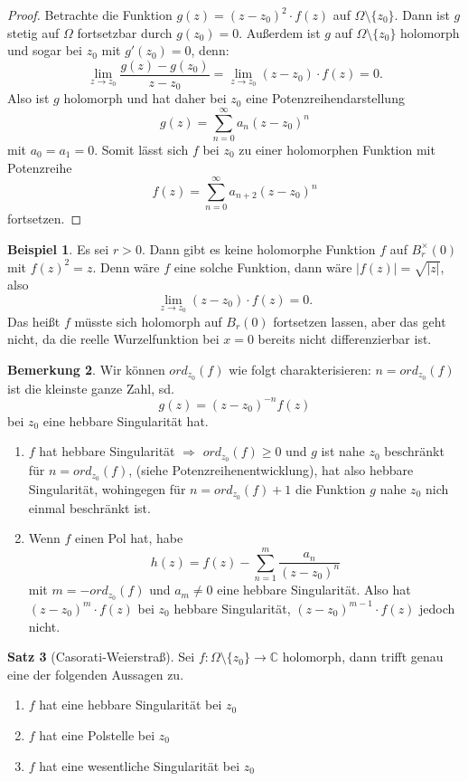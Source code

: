 \documentclass[11pt,titlepage]{article}
\theoremstyle{definition}
\newtheorem{theorem}{Satz}[section]
\newtheorem{example}[theorem]{Beispiel}
\newtheorem{remark}[theorem]{Bemerkung}
\theoremstyle{remark}
\begin{document}
	\begin{proof}
		Betrachte die Funktion $g(z)=(z-z_0)^2 \cdot f(z)$ auf $\Omega\setminus\{z_0\}$. Dann ist 
		$g$ stetig auf $\Omega$ fortsetzbar durch $g(z_0)=0$. Außerdem ist $g$ auf 
		$\Omega\setminus\{z_0\}$ holomorph und sogar bei $z_0$ mit $g'(z_0)=0$, denn:
		\[ \lim_{z\to z_0} \frac{g(z)-g(z_0)}{z-z_0} = \lim_{z\to z_0} (z-z_0)\cdot f(z) =0. \]
		Also ist $g$ holomorph und hat daher bei $z_0$ eine Potenzreihendarstellung 
		\[g(z)=\sum_{n=0}^{\infty} a_n (z-z_0)^n \] mit $a_0=a_1=0$. Somit lässt sich $f$ bei $z_0$ 
		zu einer holomorphen Funktion mit Potenzreihe
		\[f(z)=\sum_{n=0}^{\infty} a_{n+2}(z-z_0)^n \]
		fortsetzen.
	\end{proof}
	
	\begin{example}
		Es sei $r>0$. Dann gibt es keine holomorphe Funktion $f$ auf $B_r^{\times}(0)$ mit $f(z)^2 =z$. 
		Denn wäre $f$ eine solche Funktion, dann wäre $|f(z)|=\sqrt{|z|}$, also 
		\[\lim_{z\to z_0} (z-z_0)\cdot f(z) =0. \]
		Das heißt $f$ müsste sich holomorph auf $B_r(0)$ fortsetzen lassen, aber das geht nicht, da die 
		reelle Wurzelfunktion bei $x=0$ bereits nicht differenzierbar ist.
	\end{example}
	
	\begin{remark}
		Wir können $ord_{z_0}(f)$ wie folgt charakterisieren: $n=ord_{z_0}(f)$ ist die kleinste ganze 
		Zahl, sd.
		\[ g(z)= (z-z_0)^{-n} f(z) \]
		bei $z_0$ eine hebbare Singularität hat. 
		\begin{enumerate}
			\item $f$ hat hebbare Singularität $\Rightarrow$ $ord_{z_0}(f)\geq 0$ und $g$ ist nahe 
			$z_0$ beschränkt für $n=ord_{z_0}(f)$, (siehe Potenzreihenentwicklung), hat also 
			hebbare Singularität, wohingegen für $n=ord_{z_0}(f)+1$ die Funktion $g$ nahe 
			$z_0$ nich einmal beschränkt ist.
			\item Wenn $f$ einen Pol hat, habe
			\[ h(z)=f(z)-\sum_{n=1}^m \frac{a_n}{(z-z_0)^n} \]
			mit $m=-ord_{z_0}(f)$ und $a_m \neq 0$ eine hebbare Singularität. Also hat 
			$(z-z_0)^m \cdot f(z)$ bei $z_0$ hebbare Singularität, $(z-z_0)^{m-1}\cdot f(z)$ jedoch 
			nicht.
		\end{enumerate}
	\end{remark}
	
	\begin{theorem}[Casorati-Weierstraß]
		Sei $f:\Omega\setminus\{z_0\}\to\mathbb{C}$ holomorph, dann trifft genau eine der folgenden 
		Aussagen zu.
		\begin{enumerate}
			\item $f$ hat eine hebbare Singularität bei $z_0$
			\item $f$ hat eine Polstelle bei $z_0$
			\item $f$ hat eine wesentliche Singularität bei $z_0$
		\end{enumerate}
	\end{theorem}
	
\end{document}
